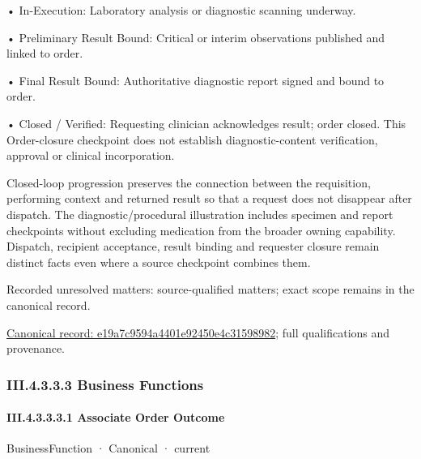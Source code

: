 •
In-Execution: Laboratory analysis or diagnostic scanning underway.



•
Preliminary Result Bound: Critical or interim observations published and linked to order.



•
Final Result Bound: Authoritative diagnostic report signed and bound to order.



•
Closed / Verified: Requesting clinician acknowledges result; order closed. This Order-closure checkpoint does not establish diagnostic-content verification, approval or clinical incorporation.



Closed-loop progression preserves the connection between the requisition, performing context and returned result so that a request does not disappear after dispatch. The diagnostic/procedural illustration includes specimen and report checkpoints without excluding medication from the broader owning capability. Dispatch, recipient acceptance, result binding and requester closure remain distinct facts even where a source checkpoint combines them.


{\small Recorded unresolved matters: source-qualified matters; exact scope remains in the canonical record.}\par
{\footnotesize \href{../../../../../../../continuum/business/business-process/e19a7c9594a4401e92450e4c31598982.md}{Canonical record: e19a7c9594a4401e92450e4c31598982}; full qualifications and provenance.}\par
\subsubsection*{III.4.3.3.3 Business Functions}
\label{navigation:III.4.3.3.3}

\paragraph*{III.4.3.3.3.1 Associate Order Outcome}
\label{navigation:III.4.3.3.3.1}

\label{element:8bc2b528ca354c8ba95ddb44facdcd05}
{\small BusinessFunction · Canonical · current}\par


